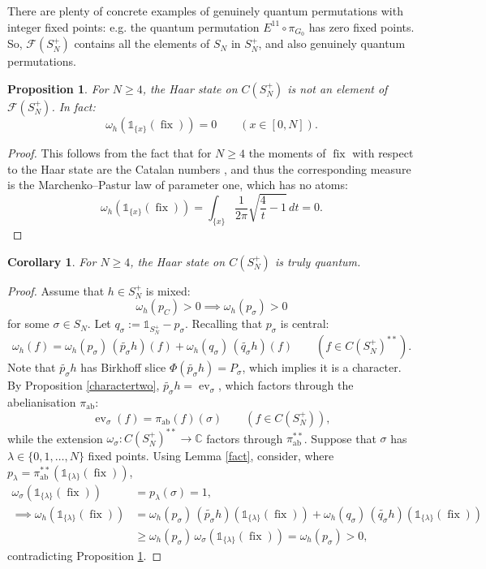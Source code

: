 \documentclass[12pt]{amsart}
\newtheorem{proposition}[theorem]{Proposition}
\newtheorem{corollary}[theorem]{Corollary}
\theoremstyle{remark}
\theoremstyle{remark}
\begin{document}
\bigskip

There are plenty of concrete examples of genuinely quantum permutations with integer fixed points: e.g. the quantum permutation $E^{11}\circ \pi_{G_0}$ has zero fixed points. So, $\mathcal{F}(S_N^+)$ contains all the elements of $S_N$ in $S_N^+$, and also genuinely quantum permutations.
\begin{proposition}\label{Haarfix}
For $N\geq 4$, the Haar state on $C(S_N^+)$ is not an element of $\mathcal{F}(S_N^+)$. In fact:
$$\omega_h(\mathds{1}_{\{x\}}(\operatorname{fix}))=0\qquad (x\in[0,N]).$$
\end{proposition}

\begin{proof}
  This follows from the fact that for $N\geq 4$ the moments of $\operatorname{fix}$ with respect to the Haar state are the Catalan numbers \cite{bb1}, and thus the corresponding measure is the Marchenko--Pastur law of parameter one, which has no atoms:
  $$\omega_h(\mathds{1}_{\{x\}}(\operatorname{fix}))=\int_{\{x\}} \frac{1}{2\pi}\sqrt{\frac{4}{t}-1}\,dt=0.$$

\end{proof}
\begin{corollary}\label{Haartq}
For $N\geq 4$, the Haar state on $C(S_N^+)$ is truly quantum.
\end{corollary}
\begin{proof}
Assume that $h\in S_N^+$ is mixed:
$$\omega_h(p_C)>0\implies \omega_h(p_{\sigma})>0$$
for some $\sigma\in S_N$. Let $q_\sigma:=\mathds{1}_{S_N^+}-p_\sigma$. Recalling that $p_\sigma$ is central:
$$\omega_h(f)=\omega_h(p_\sigma)\,(\widetilde{p_\sigma}h)(f)+\omega_h(q_\sigma)\,(\widetilde{q_\sigma}h)(f)\qquad(f\in C(S_N^+)^{**}).$$
Note that $\widetilde{p_\sigma}h$ has Birkhoff slice $\Phi(\widetilde{p_\sigma}h)=P_\sigma$, which implies it is a character. By Proposition \ref{charactertwo}, $\widetilde{p_\sigma}h=\operatorname{ev}_\sigma$, which factors through the abelianisation $\pi_{\text{ab}}$:
$$\operatorname{ev}_\sigma(f)=\pi_{\text{ab}}(f)(\sigma)\qquad (f\in C(S_N^+)),$$
 while the extension $\omega_\sigma:C(S_N^+)^{**}\to \mathbb{C}$ factors through $\pi_{\text{ab}}^{**}$. Suppose that $\sigma$ has $\lambda\in\{0,1,\dots,N\}$ fixed points. Using Lemma \ref{fact}, consider, where $p_\lambda=\pi_{\text{ab}}^{**}(\mathds{1}_{\{\lambda\}}(\operatorname{fix}))$,
 \begin{align*}
\omega_\sigma(\mathds{1}_{\{\lambda\}}(\operatorname{fix}))&=p_\lambda(\sigma)=1,
\\\implies \omega_h(\mathds{1}_{\{\lambda\}}(\operatorname{fix}))&=\omega_h(p_\sigma)\,(\widetilde{p_\sigma}h)(\mathds{1}_{\{\lambda\}}(\operatorname{fix}))+\omega_h(q_\sigma)\,(\widetilde{q_\sigma}h)(\mathds{1}_{\{\lambda\}}(\operatorname{fix}))
\\&\geq \omega_h(p_\sigma)\,\omega_\sigma(\mathds{1}_{\{\lambda\}}(\operatorname{fix}))=\omega_h(p_\sigma)>0,
\end{align*}
contradicting Proposition \ref{Haarfix}.
\end{proof}
\end{document}
